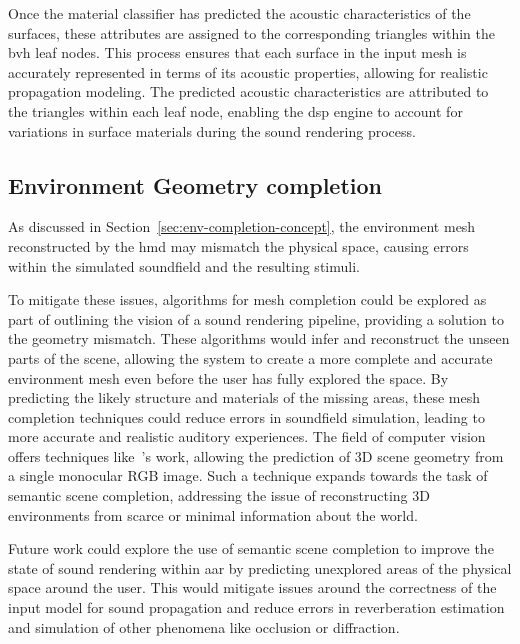 Once the material classifier has predicted the acoustic characteristics of the surfaces, these attributes are assigned to the corresponding triangles within the \acrshort{bvh} leaf nodes. This process ensures that each surface in the input mesh is accurately represented in terms of its acoustic properties, allowing for realistic propagation modeling. The predicted acoustic characteristics are attributed to the triangles within each leaf node, enabling the \acrshort{dsp} engine to account for variations in surface materials during the sound rendering process.

\subsection{Environment Geometry completion}
As discussed in Section~\ref{sec:env-completion-concept}, the environment mesh reconstructed by the \acrshort{hmd} may mismatch the physical space, causing errors within the simulated soundfield and the resulting stimuli.\par
To mitigate these issues, algorithms for mesh completion could be explored as part of outlining the vision of a sound rendering pipeline, providing a solution to the geometry mismatch. These algorithms would infer and reconstruct the unseen parts of the scene, allowing the system to create a more complete and accurate environment mesh even before the user has fully explored the space. By predicting the likely structure and materials of the missing areas, these mesh completion techniques could reduce errors in soundfield simulation, leading to more accurate and realistic auditory experiences. The field of computer vision offers techniques like~\cite{cao2022monoscene}'s work, allowing the prediction of 3D scene geometry from a single monocular RGB image. Such a technique expands towards the task of semantic scene completion, addressing the issue of reconstructing 3D environments from scarce or minimal information about the world.\par
Future work could explore the use of semantic scene completion to improve the state of sound rendering within \acrshort{aar} by predicting unexplored areas of the physical space around the user. This would mitigate issues around the correctness of the input model for sound propagation and reduce errors in reverberation estimation and simulation of other phenomena like occlusion or diffraction.

